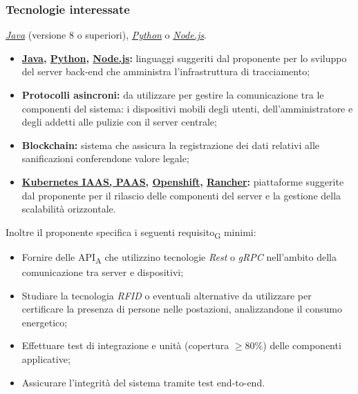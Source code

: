\subsubsection{Tecnologie interessate}

\textit{\href{https://www.java.com/it/about/}{Java}} (versione 8 o superiori), \textit{\href{https://www.python.org/about/}{Python}} o \textit{\href{https://nodejs.org/it/about/}{Node.js}}.
\begin{itemize}
	\item{\textbf{\href{https://www.java.com/it/about/}{Java}, \href{https://www.python.org/about/}{Python}, \href{https://nodejs.org/it/about/}{Node.js}:}} linguaggi suggeriti dal proponente per lo sviluppo del server back-end che amministra l'infrastruttura di tracciamento;
	\item{\textbf{Protocolli asincroni:}} da utilizzare per gestire la comunicazione tra le componenti del sistema: i dispositivi mobili degli utenti, dell'amministratore e degli addetti alle pulizie con il server centrale;
	\item{\textbf{Blockchain:}} sistema che assicura la registrazione dei dati relativi alle sanificazioni conferendone valore legale;  
	\item{\textbf{\href{https://kubernetes.io/it/docs/concepts/overview/what-is-kubernetes/}{Kubernetes IAAS, PAAS}, \href{https://www.openshift.com/learn/what-is-openshift}{Openshift}, \href{https://rancher.com/about/}{Rancher}:}} piattaforme suggerite dal proponente per il rilascio delle componenti del server e la gestione della scalabilità orizzontale.
\end{itemize}

Inoltre il proponente specifica i seguenti requisito\textsubscript{G} minimi:
\begin{itemize}
	\item Fornire delle API\textsubscript{A} che utilizzino tecnologie \textit{Rest} o \textit{gRPC} nell'ambito della comunicazione tra server e dispositivi;
	\item Studiare la tecnologia \textit{RFID} o eventuali alternative da utilizzare per certificare la presenza di persone nelle postazioni, analizzandone il consumo energetico;
	\item Effettuare test di integrazione e unità (copertura $\geq 80\%$) delle componenti applicative;
	\item Assicurare l'integrità del sistema tramite test end-to-end.
\end{itemize}
	
